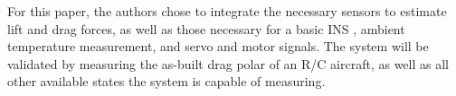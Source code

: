 For this paper, the authors chose to integrate the necessary sensors to estimate lift and drag forces, as well as those necessary for a basic INS , ambient temperature measurement, and servo and motor signals. The system will be validated by measuring the as-built drag polar of an R/C aircraft, as well as all other available states the system is capable of measuring.